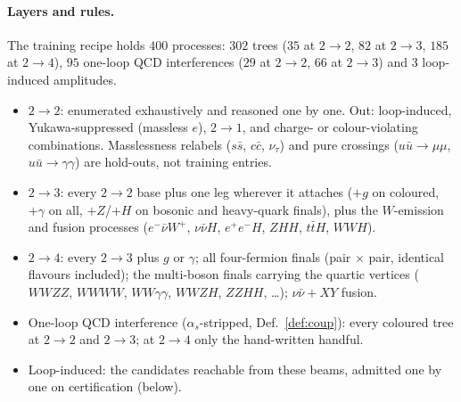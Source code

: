 \documentclass[11pt]{article}
\begin{document}
\paragraph{Layers and rules.} The training recipe holds $400$ processes: $302$ trees ($35$ at
$2\to2$, $82$ at $2\to3$, $185$ at $2\to4$), $95$ one-loop QCD interferences ($29$ at $2\to2$,
$66$ at $2\to3$) and $3$ loop-induced amplitudes.
\begin{itemize}
  \item $2\to2$: enumerated exhaustively and reasoned one by one. Out: loop-induced,
    Yukawa-suppressed (massless $e$), $2\to1$, and charge- or colour-violating combinations.
    Masslessness relabels ($s\bar s$, $c\bar c$, $\nu_\tau$) and pure crossings
    ($u\bar u\to\mu\mu$, $u\bar u\to\gamma\gamma$) are hold-outs, not training entries.
  \item $2\to3$: every $2\to2$ base plus one leg wherever it attaches ($+g$ on coloured,
    $+\gamma$ on all, $+Z$/$+H$ on bosonic and heavy-quark finals), plus the $W$-emission and
    fusion processes ($e^-\bar\nu W^+$, $\nu\bar\nu H$, $e^+e^-H$, $ZHH$, $t\bar tH$, $WWH$).
  \item $2\to4$: every $2\to3$ plus $g$ or $\gamma$; all four-fermion finals (pair $\times$
    pair, identical flavours included); the multi-boson finals carrying the quartic vertices
    ($WWZZ$, $WWWW$, $WW\gamma\gamma$, $WWZH$, $ZZHH$, \dots); $\nu\bar\nu + XY$ fusion.
  \item One-loop QCD interference ($\alpha_s$-stripped, Def.~\ref{def:coup}): every coloured
    tree at $2\to2$ and $2\to3$; at $2\to4$ only the hand-written handful.
  \item Loop-induced: the candidates reachable from these beams, admitted one by one on
    certification (below).
\end{itemize}
\end{document}
